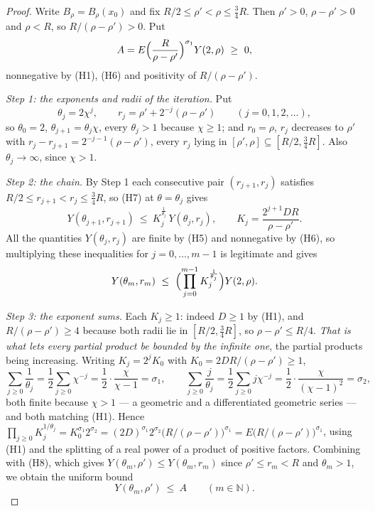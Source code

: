 \begin{proof}
Write $B_\rho=B_\rho(x_0)$ and fix $R/2\le\rho'<\rho\le\frac34R$.  Then
$\rho'>0$, $\rho-\rho'>0$ and $\rho<R$, so $R/(\rho-\rho')>0$.  Put
\[
A=E\Bigl(\frac R{\rho-\rho'}\Bigr)^{\sigma_1}Y(2,\rho)\ \ge\ 0 ,
\]
nonnegative by (H1), (H6) and positivity of $R/(\rho-\rho')$.

\emph{Step 1: the exponents and radii of the iteration.}  Put
\[
\theta_j=2\chi^j,\qquad r_j=\rho'+2^{-j}(\rho-\rho')\qquad(j=0,1,2,\dots),
\]
so $\theta_0=2$, $\theta_{j+1}=\theta_j\chi$, every $\theta_j>1$ because
$\chi\ge1$; and $r_0=\rho$, $r_j$ decreases to $\rho'$ with
$r_j-r_{j+1}=2^{-j-1}(\rho-\rho')$, every $r_j$ lying in
$[\rho',\rho]\subseteq[R/2,\frac34R]$.  Also $\theta_j\to\infty$, since
$\chi>1$.

\emph{Step 2: the chain.}  By Step 1 each consecutive pair
$(r_{j+1},r_j)$ satisfies $R/2\le r_{j+1}<r_j\le\frac34R$, so (H7) at
$\theta=\theta_j$ gives
\[
Y(\theta_{j+1},r_{j+1})\ \le\ K_j^{\frac1{\theta_j}}\,Y(\theta_j,r_j),
\qquad
K_j=\frac{2^{j+1}DR}{\rho-\rho'} .
\]
All the quantities $Y(\theta_j,r_j)$ are finite by (H5) and nonnegative by
(H6), so multiplying these inequalities for $j=0,\dots,m-1$ is legitimate and
gives
\[
Y(\theta_m,r_m)\ \le\ \Bigl(\prod_{j=0}^{m-1}K_j^{\frac1{\theta_j}}\Bigr)Y(2,\rho).
\]

\emph{Step 3: the exponent sums.}  Each $K_j\ge1$: indeed $D\ge1$ by (H1), and
$R/(\rho-\rho')\ge4$ because both radii lie in $[R/2,\frac34R]$, so
$\rho-\rho'\le R/4$.  \emph{That is what lets every partial product be bounded
by the infinite one}, the partial products being increasing.  Writing
$K_j=2^jK_0$ with $K_0=2DR/(\rho-\rho')\ge1$,
\[
\sum_{j\ge0}\frac1{\theta_j}=\frac12\sum_{j\ge0}\chi^{-j}
=\frac12\cdot\frac\chi{\chi-1}=\sigma_1,
\qquad
\sum_{j\ge0}\frac j{\theta_j}=\frac12\sum_{j\ge0}j\chi^{-j}
=\frac12\cdot\frac\chi{(\chi-1)^2}=\sigma_2,
\]
both finite because $\chi>1$ --- a geometric and a differentiated geometric
series --- and both matching (H1).  Hence
$\prod_{j\ge0}K_j^{1/\theta_j}=K_0^{\sigma_1}2^{\sigma_2}
=(2D)^{\sigma_1}2^{\sigma_2}\bigl(R/(\rho-\rho')\bigr)^{\sigma_1}
=E\bigl(R/(\rho-\rho')\bigr)^{\sigma_1}$, using (H1) and the splitting of a
real power of a product of positive factors.  Combining with (H8), which gives
$Y(\theta_m,\rho')\le Y(\theta_m,r_m)$ since $\rho'\le r_m<R$ and
$\theta_m>1$, we obtain the uniform bound
\[
Y(\theta_m,\rho')\ \le\ A\qquad(m\in\mathbb{N}).
\tag{1}
\]


\end{proof}
